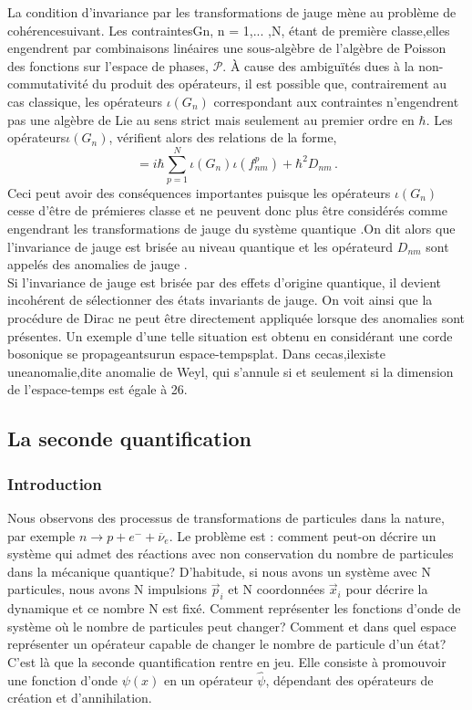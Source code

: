 \documentclass[12pt,a4paper, openany]{article}
\begin{document}
La condition d’invariance par les transformations de jauge mène au problème de cohérencesuivant. Les contraintesGn, n = 1,... ,N, étant de première classe,elles engendrent par combinaisons linéaires une sous-algèbre de l’algèbre de Poisson des fonctions sur l’espace de phases, $\mathcal{P}$. À cause des ambiguïtés dues à la non-commutativité du produit des opérateurs, il est possible que, contrairement au cas classique, les opérateurs $\iota(G_n) $ correspondant aux contraintes n’engendrent pas une algèbre de Lie au sens strict mais seulement au premier ordre en $\hbar$. Les opérateurs$\iota(G_n) $,  vériﬁent alors des relations de la forme,
\begin{equation}
[\iota(G_n),\iota(G_m)]=i{\hbar}\sum_{p=1}^{N}\iota(G_n)\iota(f_{nm}^p)	+{\hbar}^2D_{nm}\,.
\end{equation}
Ceci peut avoir des conséquences importantes puisque les opérateurs $\iota(G_n) $ cesse d'\^{e}tre de prémieres classe et ne peuvent donc plus \^{e}tre considérés comme engendrant les transformations de jauge du système quantique .On dit alors que l'invariance de jauge est brisée au niveau quantique et les opérateurd $D_{nm} $ sont appelés des anomalies de jauge . \\
Si l’invariance de jauge est brisée par des eﬀets d’origine quantique, il devient incohérent de sélectionner des états invariants de jauge. On voit ainsi que la procédure de Dirac ne peut être directement appliquée lorsque des anomalies sont présentes. Un exemple d’une telle situation est obtenu en considérant une corde bosonique se propageantsurun espace-tempsplat. Dans cecas,ilexiste uneanomalie,dite anomalie de Weyl, qui s’annule si et seulement si la dimension de l’espace-temps est égale à 26. 
\subsection{La seconde quantification}
\subsubsection{Introduction}

\hspace{0.5cm}Nous observons des processus de transformations de particules dans la nature, par exemple $n\rightarrow{p+e^{-}+\overline{\nu}_e}$. Le problème est : comment peut-on décrire un système qui admet des réactions avec non conservation du nombre de particules dans la mécanique quantique? D’habitude, si nous avons un système avec N particules, nous avons N impulsions $\vec{p}_i $ et N coordonnées $\vec{x}_i $ pour décrire la dynamique et ce nombre N est ﬁxé. Comment représenter les fonctions d’onde de système où le nombre de particules peut changer? Comment et dans quel espace représenter un opérateur capable de changer le nombre de particule d’un état? C’est là que la seconde quantiﬁcation rentre en jeu. Elle consiste à promouvoir une fonction d’onde $\psi(x) $ en un opérateur $\hat{\psi} $, dépendant des opérateurs de création et d’annihilation.
\end{document}
